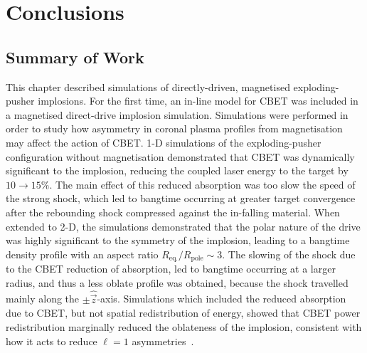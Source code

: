 \section{Conclusions}%
\label{sec:Res2_conclusions}

\subsection{Summary of Work}%
\label{sec:Res2_summary}

This chapter described simulations of directly-driven, magnetised exploding-pusher implosions.
For the first time, an in-line model for \ac{CBET} was included in a magnetised direct-drive implosion simulation.
Simulations were performed in order to study how asymmetry in coronal plasma profiles from magnetisation may affect the action of \ac{CBET}.
1-D simulations of the exploding-pusher configuration without magnetisation demonstrated that \ac{CBET} was dynamically significant to the implosion, reducing the coupled laser energy to the target by $10\rightarrow15\%$.
The main effect of this reduced absorption was too slow the speed of the strong shock, which led to bangtime occurring at greater target convergence after the rebounding shock compressed against the in-falling material.
When extended to 2-D, the simulations demonstrated that the polar nature of the drive was highly significant to the symmetry of the implosion, leading to a bangtime density profile with an aspect ratio $R_{\text{eq.}}/R_{\text{pole}}\sim 3$.
The slowing of the shock due to the \ac{CBET} reduction of absorption, led to bangtime occurring at a larger radius, and thus a less oblate profile was obtained, because the shock travelled mainly along the $\pm\hat{\vec{z}}$-axis.
Simulations which included the reduced absorption due to \ac{CBET}, but not spatial redistribution of energy, showed that \ac{CBET} power redistribution marginally reduced the oblateness of the implosion, consistent with how it acts to reduce $\ell=1$ asymmetries~\cite{anderson_effect_2020}.

